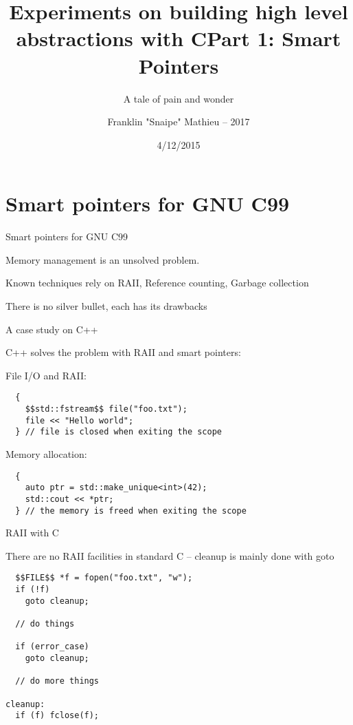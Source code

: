 \documentclass[10pt]{beamer}
\title{Experiments on building high level abstractions with C\newline\newline Part 1: Smart Pointers}
\subtitle{A tale of pain and wonder}
\date{4/12/2015}
\author{Franklin "Snaipe" Mathieu -- 2017}
\institute{EPITA -- GCONFS}
\begin{document}
\maketitle

\section{Smart pointers for GNU C99}

\begin{frame}{Smart pointers for GNU C99}

  Memory management is an unsolved problem.

  Known techniques rely on RAII, Reference counting, Garbage collection

  There is no silver bullet, each has its drawbacks

\end{frame}

\begin{frame}[fragile]{A case study on C++}

  C++ solves the problem with RAII and smart pointers:

  \pause{}

  File I/O and RAII:

  \begin{lstlisting}
  {
    $$std::fstream$$ file("foo.txt");
    file << "Hello world";
  } // file is closed when exiting the scope
  \end{lstlisting}

  \pause{}

  Memory allocation:

  \begin{lstlisting}
  {
    auto ptr = std::make_unique<int>(42);
    std::cout << *ptr;
  } // the memory is freed when exiting the scope
  \end{lstlisting}

\end{frame}

\begin{frame}[fragile]{RAII with C}

  There are no RAII facilities in standard C -- cleanup is mainly done with goto

  \begin{lstlisting}
  $$FILE$$ *f = fopen("foo.txt", "w");
  if (!f)
    goto cleanup;

  // do things

  if (error_case)
    goto cleanup;

  // do more things

cleanup:
  if (f) fclose(f);
  \end{lstlisting}

\end{frame}
\end{document}
